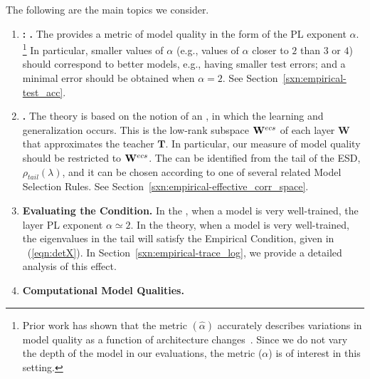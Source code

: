 The following are the main topics we consider.

\begin{enumerate}[label=6.\arabic*]
\item
\textbf{\ModelQuality: \HTSR \Phenomenology.}
The \HTSR \Phenomenology provides a metric of model quality in the form of the PL exponent $\alpha$.%
\footnote{Prior work has shown that the \ALPHAHAT metric $(\hat{\alpha})$ accurately describes variations in model 
quality as a function of architecture changes~\cite{MM21a_simpsons_TR}. Since we do not vary the depth of the model in 
our evaluations, the \ALPHA metric ($\alpha$) is of interest in this setting.} 
In particular, smaller values of $\alpha$ (e.g., 
values of $\alpha$ closer to $2$ than $3$ or $4$) should correspond to better models, e.g., having smaller test errors; and
a minimal error should be obtained when $\alpha=2$.
See Section~\ref{sxn:empirical-test_acc}.
\item 
\textbf{\EffectiveCorrelationSpace.}
The \SETOL theory is based on the notion of an \EffectiveCorrelationSpace, in which the learning and generalization occurs. 
This is the low-rank subspace $\mathbf{W}^{ecs}$ of each layer $\mathbf{W}$ that approximates the teacher $\mathbf{T}$.
In particular, 
our measure of model quality should be restricted to $\mathbf{W}^{ecs}$.
The \EffectiveCorrelationSpace can be identified from the tail of the ESD, $\rho_{tail}(\lambda)$, and it can be chosen according to one of several related Model Selection Rules.
See Section~\ref{sxn:empirical-effective_corr_space}.
\item 
\textbf{Evaluating the \TRACELOG  Condition.}
In the \HTSR \Phenomenology, when a model is very well-trained, the layer PL exponent $\alpha\simeq 2$.
In the \SETOL theory, when a model is very well-trained, the eigenvalues in the tail will satisfy the Empirical \TRACELOG  Condition, given in \EQN~(\ref{eqn:detX}).
In Section~\ref{sxn:empirical-trace_log}, we provide a detailed analysis of this effect.
\item
\textbf{Computational Model Qualities.}

\end{enumerate}

